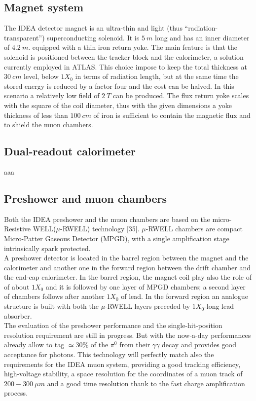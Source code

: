 \subsection{Magnet system}
The IDEA detector magnet is an ultra-thin and light (thus “radiation-transparent”) superconducting solenoid. It is $5\ m$ long and has an inner diameter of $4.2\ m$. equipped with a thin iron return yoke. The main feature is that the solenoid is positioned between the tracker block and the calorimeter, a solution currently employed in ATLAS.
This choice impose to keep the total thickness at $30\ cm$ level, below $1 X_0$  in terms of radiation length, but at the same time the stored energy is reduced by a factor four and the cost can be halved.
In this scenario a relatively low field of $2\ T$ can be produced.
The flux return yoke scales with the square of the coil diameter, thus with the given dimensions a yoke thickness of less than $100\ cm$ of iron is sufficient to contain the magnetic flux and to shield the muon chambers.

\subsection{Dual-readout calorimeter}
aaa

\subsection{Preshower and muon chambers}
Both the IDEA preshower and the muon chambers are based on the micro-Resistive WELL($\mu$-RWELL) technology [35]. $\mu$-RWELL chambers are compact Micro-Patter Gaseous Detector (MPGD), with a single amplification stage intrinsically spark protected.\\

A preshower detector is located in the barrel region between the magnet and the calorimeter and another one in the forward region between the drift chamber and the end-cap calorimeter.
In the barrel region, the magnet coil play also the role of of about $1 X_0$ and it is followed by one layer of MPGD chambers; a second layer of chambers follows after another $1 X_0$ of lead. In the forward region an analogue structure is built with both the $\mu$-RWELL layers preceded by $1 X_0$-long lead absorber.\\
The evaluation of the preshower performance and the single-hit-position resolution requirement are still in progress.
But with the now-a-day performances already allow to tag $\simeq 30\%$ of the $\pi^0$ from their $\gamma\gamma$ decay and provides good acceptance for photons.
This technology will perfectly match also the requirements for the IDEA muon system, providing a good tracking efficiency, high-voltage stability, a space resolution for the coordinates of a muon track of $200-300\ \mu m$ and a good time resolution thank to the fast charge amplification process.\\

